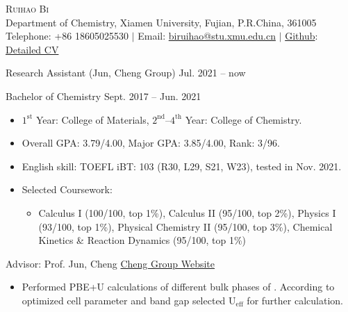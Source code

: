 \pagestyle{plain}
\thispagestyle{empty} %
\begin{center}
    \Large{\textsc{Ruihao Bi}} \\ 
    \normalsize {Department of Chemistry, Xiamen University, Fujian, P.R.China, 361005} \\ 
    Telephone: {+86 18605025530} $|$ 
    Email: {\href{mailto:biruihao@stu.xmu.edu.cn}{biruihao@stu.xmu.edu.cn}} $|$ 
    \href{https://github.com/ruihao69}{Github}: \href{https://github.com/ruihao69/brh-cv}{Detailed CV}  \\
\end{center}

\sectionrule
{}

\noindent Research Assistant (Jun, Cheng Group) \hfill {Jul. 2021 -- now}

\noindent Bachelor of Chemistry \hfill {Sept. 2017 -- Jun. 2021}

\begin{itemize}
    \item $\mathrm{1^{st}}$ Year: College of Materials, $\mathrm{2^{nd}}$--$\mathrm{4^{th}}$ Year: College of Chemistry.
    \item Overall GPA: 3.79/4.00, Major GPA: 3.85/4.00, Rank: 3/96.
    \item English skill: TOEFL iBT: 103 (R30, L29, S21, W23), tested in Nov. 2021.
    \item Selected Coursework:
    \begin{itemize}
        \item Calculus I (100/100, top 1\%), Calculus II (95/100, top 2\%), Physics I (93/100, top 1\%), Physical Chemistry II (95/100, top 3\%), Chemical Kinetics \& Reaction Dynamics (95/100, top 1\%)
    \end{itemize}
\end{itemize}

\vspace{5mm}
\sectionrule



{\noindent Advisor: Prof. Jun, Cheng  \hfill \href{https://chengjun.xmu.edu.cn/}{Cheng Group Website}}

\begin{itemize}
    \item Performed PBE+U calculations of different bulk phases of . According to optimized cell parameter and band gap selected $\mathrm{U_{eff}}$ for further calculation.  
\end{itemize}

